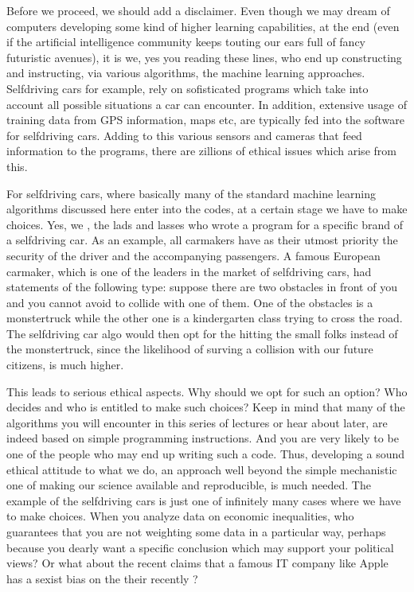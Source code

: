 \documentclass[letterpaper,10pt,english]{sphinxmanual}
\begin{document}
Before we proceed, we should add a disclaimer. Even though
we may dream of computers developing some kind of higher learning
capabilities, at the end (even if the artificial intelligence
community keeps touting our ears full of fancy futuristic avenues), it is we, yes you reading these lines,
who end up constructing and instructing, via various algorithms, the
machine learning approaches. Self\sphinxhyphen{}driving cars for example, rely on sofisticated
programs which take into account all possible situations a car can
encounter. In addition, extensive usage of training data from GPS
information, maps etc, are typically fed into the software for
self\sphinxhyphen{}driving cars. Adding to this various sensors and cameras that
feed information to the programs, there are zillions of ethical issues
which arise from this.

For self\sphinxhyphen{}driving cars, where basically many of the standard machine
learning algorithms discussed here enter into the codes, at a certain
stage we have to make choices. Yes, we , the lads and lasses who wrote
a program for a specific brand of a self\sphinxhyphen{}driving car.  As an example,
all carmakers have as their utmost priority the security of the
driver and the accompanying passengers. A famous European carmaker, which is
one of the leaders in the market of self\sphinxhyphen{}driving cars, had 
statements of the following type: suppose there are two obstacles in
front of you and you cannot avoid to collide with one of them. One of
the obstacles is a monstertruck while the other one is a kindergarten
class trying to cross the road. The self\sphinxhyphen{}driving car algo would then
opt for the hitting the small folks instead of the monstertruck, since
the likelihood of surving a collision with our future citizens, is
much higher.

This leads to serious ethical aspects. Why should we opt for such an
option? Who decides and who is entitled to make such choices? Keep in
mind that many of the algorithms you will encounter in this series of
lectures or hear about later, are indeed based on simple programming
instructions. And you are very likely to be one of the people who may
end up writing such a code. Thus, developing a sound ethical attitude
to what we do, an approach well beyond the simple mechanistic one of
making our science available and reproducible, is much needed. The
example of the self\sphinxhyphen{}driving cars is just one of infinitely many cases
where we have to make choices. When you analyze data on economic
inequalities, who guarantees that you are not weighting some data in a
particular way, perhaps because you dearly want a specific conclusion
which may support your political views? Or what about the recent
claims that a famous IT company like Apple has a sexist bias on the
their recently ?
\end{document}
